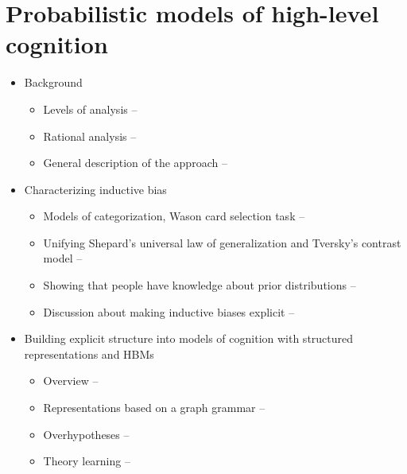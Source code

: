 \documentclass[12pt]{article}
\begin{document}

\section{Probabilistic models of high-level cognition}

\begin{itemize}
\item Background
    \begin{itemize}
    \item Levels of analysis -- \citep{Marr1971}
    \item Rational analysis -- \citep{Anderson1990,Chater1999}
    \item General description of the approach -- \citep{Jacobs2011}
    \end{itemize}

\item Characterizing inductive bias
    \begin{itemize}
    \item Models of categorization, Wason card selection task -- \citep{Chater1999}
    \item Unifying Shepard's universal law of generalization and Tversky's contrast model -- \citep{Tenenbaum2001}
    \item Showing that people have knowledge about prior distributions -- \citep{Griffiths2009}
    \item Discussion about making inductive biases explicit -- \citep{Griffiths2010}
    \end{itemize}

\item Building explicit structure into models of cognition with structured representations and HBMs
    \begin{itemize}
    \item Overview -- \citep{Tenenbaum2011}
    \item Representations based on a graph grammar -- \citep{Kemp2008}
    \item Overhypotheses -- \citep{Kemp2007}
    \item Theory learning -- \citep{Griffiths2009,Kemp2010,Ullman2012}
    \end{itemize}
\end{itemize}
\end{document}
